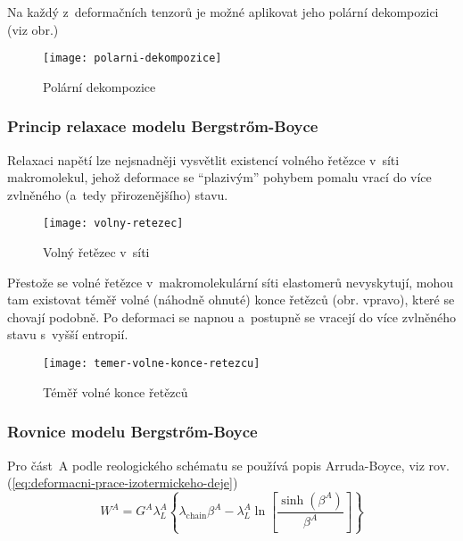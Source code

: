 Na každý z~deformačních tenzorů je možné aplikovat jeho polární dekompozici (viz obr.)
\begin{figure}[H]
	\centering
	\texttt{[image: polarni-dekompozice]}
	\caption{Polární dekompozice}
	\label{fig:polarni-dekompozice}
\end{figure}

\subsubsection{Princip relaxace modelu Bergstr\H{o}m-Boyce}
Relaxaci napětí lze nejsnadněji vysvětlit existencí volného řetězce v~síti makromolekul, jehož deformace se \enquote{plazivým} pohybem pomalu vrací do více zvlněného (a~tedy přirozenějšího) stavu.
\begin{figure}[H]
	\centering
	\texttt{[image: volny-retezec]}
	\caption{Volný řetězec v~síti}
	\label{fig:volny-retezec}
\end{figure}

Přestože se volné řetězce v~makromolekulární síti  elastomerů nevyskytují, mohou tam existovat téměř volné (náhodně ohnuté) konce řetězců (obr. vpravo), které se chovají podobně.
Po deformaci se napnou a~postupně se vracejí do více zvlněného stavu s~vyšší entropií.
\begin{figure}[H]
	\centering
	\texttt{[image: temer-volne-konce-retezcu]}
	\caption{Téměř volné konce řetězců}
	\label{fig:temer-volne-konce-retezcu}
\end{figure}

\subsubsection{Rovnice modelu Bergstrőm-Boyce}
Pro část~A podle reologického schématu se používá popis Arruda-Boyce, viz rov. (\ref{eq:deformacni-prace-izotermickeho-deje})
\begin{equation}
	W^A = G^A \lambda_L^A \left\{ \lambda_\text{chain} \beta^A - \lambda_L^A \ln\left[ \frac{\sinh\left(\beta^A\right)}{\beta^A} \right] \right\}
\end{equation}

